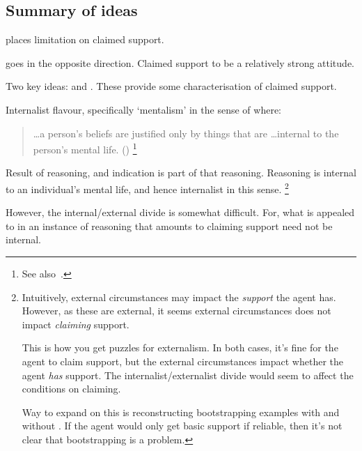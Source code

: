\subsection{Summary of ideas}
\label{sec:summary-1}

\begin{note}
  \ideaCSA{} places limitation on claimed support.

  \ideaCSB{} goes in the opposite direction.
  Claimed support to be a relatively strong attitude.
\end{note}

\begin{note}
  Two key ideas: \ideaCSA{} and \ideaCSB{}.
  These provide some characterisation of claimed support.
\end{note}

\begin{note}
  Internalist flavour, specifically `mentalism' in the sense of \citeauthor{Feldman:2001uy} where:
  \begin{quote}
    \dots a person's beliefs are justified only by things that are \dots internal to the person's mental life.\nolinebreak
    \mbox{}\hfill\mbox{(\citeyear[233]{Feldman:2001uy})}\nolinebreak
    \footnote{
      See also~\textcite[\S4,9]{Pappas:2017vi}.
    }
  \end{quote}
  Result of reasoning, and indication is part of that reasoning.
  Reasoning is internal to an individual's mental life, and hence internalist in this sense.\nolinebreak
  \footnote{
    \color{red}
    Intuitively, external circumstances may impact the \emph{support} the agent has.
    However, as these are external, it seems external circumstances does not impact \emph{claiming} support.

    This is how you get puzzles for externalism.
    In both cases, it's fine for the agent to claim support, but the external circumstances impact whether the agent \emph{has} support.
    The internalist/externalist divide would seem to affect the conditions on claiming.

    Way to expand on this is reconstructing bootstrapping examples with and without \eiS{}.
    If the agent would only get basic support if reliable, then it's not clear that bootstrapping is a problem.
  }

  However, the internal/external divide is somewhat difficult.
  For, what is appealed to in an instance of reasoning that amounts to claiming support need not be internal.
\end{note}

